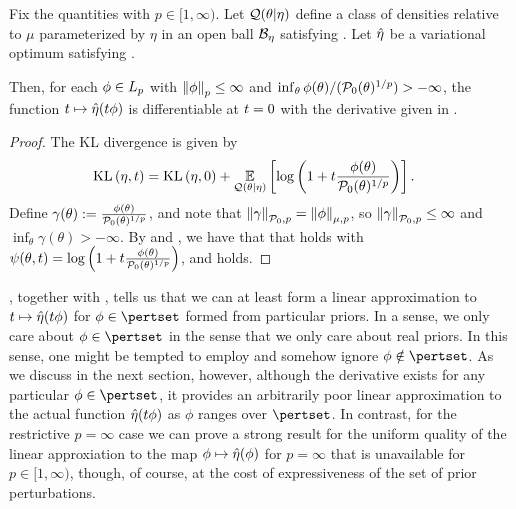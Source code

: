 
\begin{thm}
%
Fix the quantities  with $p \in [1, \infty)$.
Let $\mathcal{Q}(\theta \vert \eta)$ define a class of densities relative to $\mu$
parameterized by $\eta$ in an open ball $\mathcal{B}_\eta$ satisfying
.  Let $\hat\eta$ be a variational optimum satisfying
.

Then, for each $\phi \in {L_{p}}$ with $\left\Vert\phi\right\Vert_p \le \infty$ and
$\inf_\theta \phi(\theta) / (\mathcal{P}_{0}(\theta)^{1/p})> -\infty$, the function $t
\mapsto \hat\eta(t \phi)$ is differentiable at $t = 0$ with the derivative
given in .
%
\begin{proof}
%
The KL divergence is given by
%
\begin{align*}
%
\KL{\eta, \t} ={}&
    \KL{\eta, 0} +
    \expect{\q(\theta \vert \eta)}
           {\log \left(1 + \t \frac{\phi(\theta)}{\pbase(\theta)^{1/p}} \right)}.
%
\end{align*}
%
Define $\gamma(\theta) := \frac{\phi(\theta)}{\mathcal{P}_{0}(\theta)^{1/p}}$, and note
that $\left\Vert\gamma\right\Vert_{\mathcal{P}_{0}, p} = \left\Vert\phi\right\Vert_{\mu,p}$, so
$\left\Vert\gamma\right\Vert_{\mathcal{P}_{0}, p} \le \infty$ and $\inf_\theta \gamma(\theta) >
-\infty$.  By  and , we have
that that  holds with $\psi(\theta, t) = \log \left(1 +
t \frac{\phi(\theta)}{\mathcal{P}_{0}(\theta)^{1/p}}\right)$, and 
holds.
%
\end{proof}
%
\end{thm}

, together with , tells us
that we can at least form a linear approximation to $t \mapsto \hat\eta(t
\phi)$ for $\phi \in \pertset$ formed from particular priors.  In a sense, we
only care about $\phi \in \pertset$ in the sense that we only care about real
priors.  In this sense, one might be tempted to employ 
and somehow ignore $\phi \notin \pertset$.  As we discuss in the next section,
however, although the derivative exists for any particular $\phi \in \pertset$,
it provides an arbitrarily poor linear approximation to the actual function
$\hat\eta(t \phi)$ as $\phi$ ranges over $\pertset$.  In contrast, for the
restrictive $p=\infty$ case we can prove a strong result for the uniform quality
of the linear approxiation to the  map $\phi \mapsto \hat\eta(\phi)$ for $p =
\infty$ that is unavailable for $p \in [1, \infty)$, though, of course, at the
cost of expressiveness of the set of prior perturbations.
